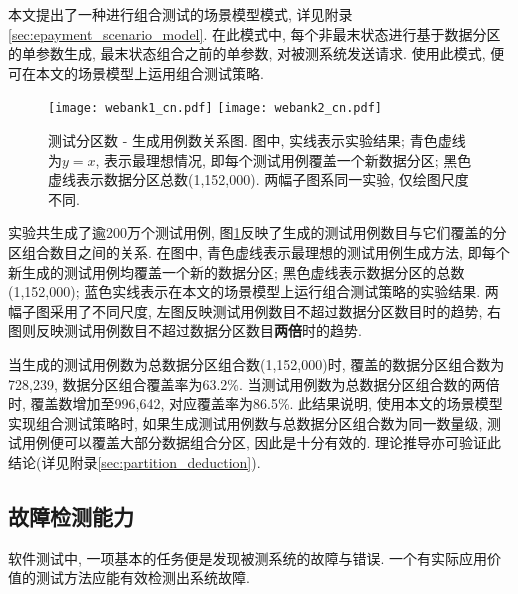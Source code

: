                 本文提出了一种进行组合测试的场景模型模式, 详见附录\ref{sec:epayment_scenario_model}. 在此模式中, 每个非最末状态进行基于数据分区的单参数生成, 最末状态组合之前的单参数, 对被测系统发送请求. 使用此模式, 便可在本文的场景模型上运用组合测试策略.
                
                \begin{figure}[!htb]
                    \centering
                    \texttt{[image: webank1\_cn.pdf]}
                    \texttt{[image: webank2\_cn.pdf]}
                    \caption{测试分区数 - 生成用例数关系图. 图中, 实线表示实验结果; 青色虚线为$y=x$, 表示最理想情况, 即每个测试用例覆盖一个新数据分区; 黑色虚线表示数据分区总数(1,152,000). 两幅子图系同一实验, 仅绘图尺度不同.}
                    \label{fig:partition}
                \end{figure}
                
                实验共生成了逾200万个测试用例, 图\ref{fig:partition}反映了生成的测试用例数目与它们覆盖的分区组合数目之间的关系. 在图中, 青色虚线表示最理想的测试用例生成方法, 即每个新生成的测试用例均覆盖一个新的数据分区; 黑色虚线表示数据分区的总数(1,152,000); 蓝色实线表示在本文的场景模型上运行组合测试策略的实验结果. 两幅子图采用了不同尺度, 左图反映测试用例数目不超过数据分区数目时的趋势, 右图则反映测试用例数目不超过数据分区数目\textbf{两倍}时的趋势.
                
                当生成的测试用例数为总数据分区组合数(1,152,000)时, 覆盖的数据分区组合数为728,239, 数据分区组合覆盖率为63.2\%. 当测试用例数为总数据分区组合数的两倍时, 覆盖数增加至996,642, 对应覆盖率为86.5\%. 此结果说明, 使用本文的场景模型实现组合测试策略时, 如果生成测试用例数与总数据分区组合数为同一数量级, 测试用例便可以覆盖大部分数据组合分区, 因此是十分有效的. 理论推导亦可验证此结论(详见附录\ref{sec:partition_deduction}).
    
        \subsection{故障检测能力}
        
            软件测试中, 一项基本的任务便是发现被测系统的故障与错误. 一个有实际应用价值的测试方法应能有效检测出系统故障.
            
